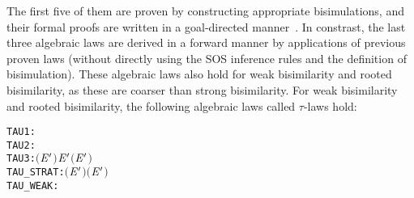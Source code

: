 The first five of them are proven by constructing appropriate bisimulations,
and their formal proofs are written in
a goal-directed manner~\citep[Chapter 4]{holdesc}. In constrast, the
last three algebraic laws are derived in a forward manner by applications of
previous proven laws (without directly using the SOS
inference rules and the definition of bisimulation).
 These algebraic laws also hold for weak bisimilarity and rooted
  bisimilarity, as these are coarser than strong bisimilarity. 
For weak bisimilarity and rooted bisimilarity, the following algebraic
laws called $\tau$-laws hold:
\begin{alltt}
TAU1:      \HOLTokenTurnstile{} \HOLSymConst{\ensuremath{\ldotp}}\HOLSymConst{\ensuremath{\tau}}\HOLSymConst{\ensuremath{\ldotp}} \HOLSymConst{\HOLTokenObsCongr} \HOLSymConst{\ensuremath{\ldotp}}
TAU2:      \HOLTokenTurnstile{}  \HOLSymConst{\ensuremath{+}} \HOLSymConst{\ensuremath{\tau}}\HOLSymConst{\ensuremath{\ldotp}} \HOLSymConst{\HOLTokenObsCongr} \HOLSymConst{\ensuremath{\tau}}\HOLSymConst{\ensuremath{\ldotp}}
TAU3:      \HOLTokenTurnstile{} \HOLSymConst{\ensuremath{\ldotp}}\ensuremath{(} \HOLSymConst{\ensuremath{+}} \HOLSymConst{\ensuremath{\tau}}\HOLSymConst{\ensuremath{\ldotp}}\ensuremath{\HOLFreeVar{E}\sp{\prime}}\ensuremath{)} \HOLSymConst{\ensuremath{+}} \HOLSymConst{\ensuremath{\ldotp}}\ensuremath{\HOLFreeVar{E}\sp{\prime}} \HOLSymConst{\HOLTokenObsCongr} \HOLSymConst{\ensuremath{\ldotp}}\ensuremath{(} \HOLSymConst{\ensuremath{+}} \HOLSymConst{\ensuremath{\tau}}\HOLSymConst{\ensuremath{\ldotp}}\ensuremath{\HOLFreeVar{E}\sp{\prime}}\ensuremath{)}
TAU_STRAT: \HOLTokenTurnstile{}  \HOLSymConst{\ensuremath{+}} \HOLSymConst{\ensuremath{\tau}}\HOLSymConst{\ensuremath{\ldotp}}\ensuremath{(}\ensuremath{\HOLFreeVar{E}\sp{\prime}} \HOLSymConst{\ensuremath{+}} \ensuremath{)} \HOLSymConst{\HOLTokenObsCongr} \HOLSymConst{\ensuremath{\tau}}\HOLSymConst{\ensuremath{\ldotp}}\ensuremath{(}\ensuremath{\HOLFreeVar{E}\sp{\prime}} \HOLSymConst{\ensuremath{+}} \ensuremath{)}
TAU_WEAK:  \HOLTokenTurnstile{} \HOLSymConst{\ensuremath{\tau}}\HOLSymConst{\ensuremath{\ldotp}} \HOLSymConst{\HOLTokenWeakEQ} 
\end{alltt}


